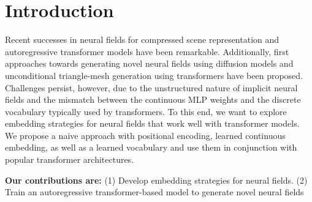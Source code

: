 \section{Introduction}
\label{sec:intro}

Recent successes in neural fields for compressed scene representation and autoregressive transformer models have been remarkable.
Additionally, first approaches towards generating novel neural fields using diffusion models \cite{erkoç2023hyperdiffusion} and unconditional triangle-mesh generation using transformers \cite{siddiqui2023meshgpt} have been proposed.
Challenges persist, however, due to the unstructured nature of implicit neural fields and the mismatch between the continuous MLP weights and the discrete vocabulary typically used by transformers.
To this end, we want to explore embedding strategies for neural fields that work well with transformer models. We propose a naive approach with positional encoding, learned continuous embedding, as well as a learned vocabulary and use them in conjunction with popular transformer architectures.



\noindent \textbf{Our contributions are: } (1) Develop embedding strategies for neural fields. (2) Train an autoregressive transformer-based model to generate novel neural fields